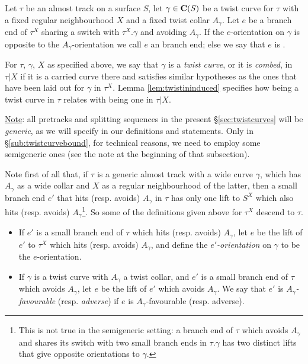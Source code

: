 \begin{defin}
Let $\tau$ be an almost track on a surface $S$, let $\gamma\in\mathbf C(S)$ be a twist curve for $\tau$ with a fixed regular neighbourhood $X$ and a fixed twist collar $A_\gamma$. Let $e$ be a branch end of $\tau^X$ sharing a switch with $\tau^X.\gamma$ and avoiding $A_\gamma$. If the $e$-orientation on $\gamma$ is opposite to the $A_\gamma$-orientation we call $e$ an  branch end; else we say that $e$ is .
\end{defin}

For $\tau$, $\gamma$, $X$ as specified above, we say that $\gamma$ is a \emph{twist curve}, or it is \emph{combed}, in $\tau|X$ if it is a carried curve there and satisfies similar hypotheses as the ones that have been laid out for $\gamma$ in $\tau^X$. Lemma \ref{lem:twistininduced} specifies how being a twist curve in $\tau$ relates with being one in $\tau|X$.

\vspace{1ex}
\ul{Note}: all pretracks and splitting sequences in the present \S \ref{sec:twistcurves} will be \emph{generic}, as we will specify in our definitions and statements. Only in \S \ref{sub:twistcurvebound}, for technical reasons, we need to employ some semigeneric ones (see the note at the beginning of that subsection).

\vspace{1ex}
Note first of all that, if $\tau$ is a generic almost track with a wide curve $\gamma$, which has $A_\gamma$ as a wide collar and $X$ as a regular neighbourhood of the latter, then a small branch end $e'$ that hits (resp. avoids) $A_\gamma$ in $\tau$ has only one lift to $S^X$ which also hits (resp. avoids) $A_\gamma$\footnote{This is not true in the semigeneric setting: a branch end of $\tau$ which avoids $A_\gamma$ and shares its switch with two small branch ends in $\tau.\gamma$ has two distinct lifts that give opposite orientations to $\gamma$.}. So some of the definitions given above for $\tau^X$ descend to $\tau$.
\begin{itemize}
\item If $e'$ is a small branch end of $\tau$ which hits (resp. avoids) $A_\gamma$, let $e$ be the lift of $e'$ to $\tau^X$ which hits (resp. avoids) $A_\gamma$, and define the \emph{$e'$-orientation} on $\gamma$ to be the $e$-orientation.
\item If $\gamma$ is a twist curve with $A_\gamma$ a twist collar, and $e'$ is a small branch end of $\tau$ which avoids $A_\gamma$, let $e$ be the lift of $e'$ which avoids $A_\gamma$. We say that $e'$ is \emph{$A_\gamma$-favourable} (resp. \emph{adverse}) if $e$ is $A_\gamma$-favourable (resp. adverse).
\end{itemize}

